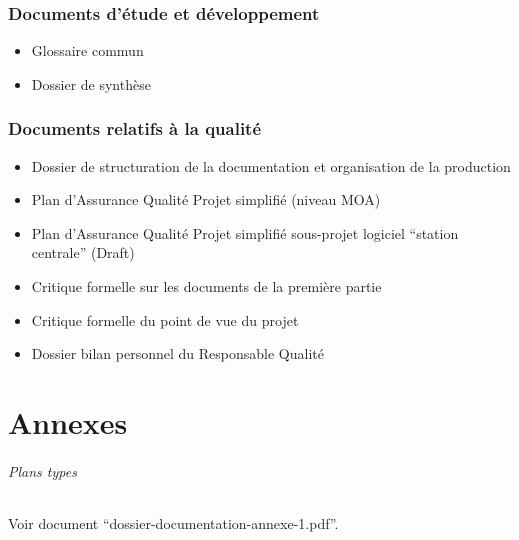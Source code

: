 \documentclass[a4paper]{article}
\begin{document}
\section{Documents d’étude et développement}

\begin{itemize}
\item Glossaire commun
\item Dossier de synthèse
\end{itemize}

\section{Documents relatifs à la qualité}

\begin{itemize}
\item Dossier de structuration de la documentation et organisation de la production
\item Plan d'Assurance Qualité Projet simplifié (niveau MOA)
\item Plan d'Assurance Qualité Projet simplifié sous-projet logiciel ``station centrale'' (Draft)
\item Critique formelle sur les documents de la première partie
\item Critique formelle du point de vue du projet
\item Dossier bilan personnel du Responsable Qualité
\end{itemize}

\part{Annexes}

\paragraph{Plans types} Voir document ``dossier-documentation-annexe-1.pdf''.
\end{document}
